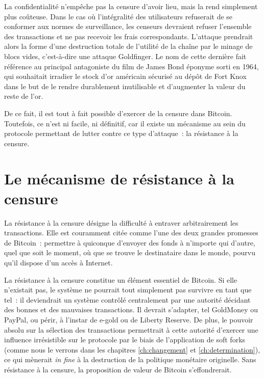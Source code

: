 La confidentialité n'empêche pas la censure d'avoir lieu, mais la rend simplement plus coûteuse. Dans le cas où l'intégralité des utilisateurs refuserait de se conformer aux normes de surveillance, les censeurs devraient refuser l'ensemble des transactions et ne pas recevoir les frais correspondants. L'attaque prendrait alors la forme d'une destruction totale de l'utilité de la chaîne par le minage de blocs vides, c'est-à-dire une attaque Goldfinger. Le nom de cette dernière fait référence au principal antagoniste du film de James Bond éponyme sorti en 1964, qui souhaitait irradier le stock d'or américain sécurisé au dépôt de Fort Knox dans le but de le rendre durablement inutilisable et d'augmenter la valeur du reste de l'or.

De ce fait, il est tout à fait possible d'exercer de la censure dans Bitcoin. Toutefois, ce n'est ni facile, ni définitif, car il existe un mécanisme au sein du protocole  permettant de lutter contre ce type d'attaque~: la résistance à la censure.

\section*{Le mécanisme de résistance à la censure}

La résistance à la censure désigne la difficulté à entraver arbitrairement les transactions. Elle est couramment citée comme l'une des deux grandes promesses de Bitcoin~: permettre à quiconque d'envoyer des fonds à n'importe qui d'autre, quel que soit le moment, où que se trouve le destinataire dans le monde, pourvu qu'il dispose d'un accès à Internet.

La résistance à la censure constitue un élément essentiel de Bitcoin. Si elle n'existait pas, le système ne pourrait tout simplement pas survivre en tant que tel~: il deviendrait un système contrôlé centralement par une autorité décidant des bonnes et des mauvaises transactions. Il devrait s'adapter, tel GoldMoney ou PayPal, ou périr, à l'instar de e-gold ou de Liberty Reserve. De plus, le pouvoir absolu sur la sélection des transactions permettrait à cette autorité d'exercer  une influence irrésistible sur le protocole par le biais de l'application de soft forks (comme nous le verrons dans les chapitres \ref{ch:changement} et \ref{ch:determination}), ce qui mènerait \emph{in fine} à la destruction de la politique monétaire originelle. Sans résistance à la censure, la proposition de valeur de Bitcoin s'effondrerait.

